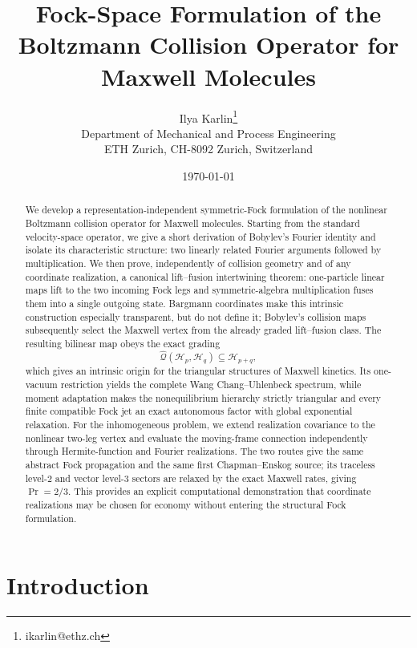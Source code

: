 \documentclass[11pt,oneside]{article}
\title{\textbf{Fock-Space Formulation of the Boltzmann Collision Operator for Maxwell Molecules}}
\author{Ilya Karlin\thanks{ikarlin@ethz.ch}\\
Department of Mechanical and Process Engineering\\
ETH Zurich, CH-8092 Zurich, Switzerland}
\date{\today}
\numberwithin{equation}{section}
\theoremstyle{definition}
\begin{document}
\maketitle

\begin{abstract}
We develop a representation-independent symmetric-Fock formulation of the nonlinear Boltzmann collision operator for Maxwell molecules.  Starting from the standard velocity-space operator, we give a short derivation of Bobylev's Fourier identity and isolate its characteristic structure: two linearly related Fourier arguments followed by multiplication.  We then prove, independently of collision geometry and of any coordinate realization, a canonical lift--fusion intertwining theorem: one-particle linear maps lift to the two incoming Fock legs and symmetric-algebra multiplication fuses them into a single outgoing state.  Bargmann coordinates make this intrinsic construction especially transparent, but do not define it; Bobylev's collision maps subsequently select the Maxwell vertex from the already graded lift--fusion class.  The resulting bilinear map obeys the exact grading
\[
\widehat{\mathcal Q}(\mathscr H_p,\mathscr H_q)\subseteq\mathscr H_{p+q},
\]
which gives an intrinsic origin for the triangular structures of Maxwell kinetics.  Its one-vacuum restriction yields the complete Wang Chang--Uhlenbeck spectrum, while moment adaptation makes the nonequilibrium hierarchy strictly triangular and every finite compatible Fock jet an exact autonomous factor with global exponential relaxation.  For the inhomogeneous problem, we extend realization covariance to the nonlinear two-leg vertex and evaluate the moving-frame connection independently through Hermite-function and Fourier realizations.  The two routes give the same abstract Fock propagation and the same first Chapman--Enskog source; its traceless level-$2$ and vector level-$3$ sectors are relaxed by the exact Maxwell rates, giving $\Pr=2/3$.  This provides an explicit computational demonstration that coordinate realizations may be chosen for economy without entering the structural Fock formulation.
\end{abstract}





\section{Introduction}
\label{sec:maxwell_introduction}
\end{document}
